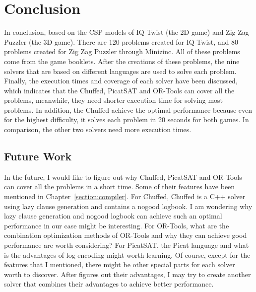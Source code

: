 \chapter{Conclusion}
\label{cha:conc}
In conclusion, based on the CSP models of IQ Twist (the 2D game) and Zig Zag Puzzler (the 3D game). There are 120 problems created for IQ Twist, and 80 problems created for Zig Zag Puzzler through Minizinc. All of these problems come from the game booklets. After the creations of these problems, the nine solvers that are based on different languages are used to solve each problem. Finally, the execution times and coverage of each solver have been discussed, which indicates that the Chuffed, PicatSAT and OR-Tools can cover all the problems, meanwhile, they need shorter execution time for solving most problems. In addition, the Chuffed achieve the optimal performance because even for the highest difficulty, it solves each problem in 20 seconds for both games. In comparison, the other two solvers need more execution times.
\section{Future Work}
\label{sec:future}
In the future, I would like to figure out why Chuffed, PicatSAT and OR-Tools can cover all the problems in a short time. Some of their features have been mentioned in Chapter~\ref{section:compiler}. 
For Chuffed,  Chuffed is a C++ solver using lazy clause generation and contains a nogood logbook. I am wondering why lazy clause generation and nogood logbook can achieve such an optimal performance in our case might be interesting. 
For OR-Tools, what are the combination optimization methods of OR-Tools and why they can achieve good performance are worth considering?
For PicatSAT, the Picat language and what is the advantages of log encoding might worth learning.
Of course, except for the features that I mentioned, there might be other special parts for each solver worth to discover. After figures out their advantages, I may try to create another solver that combines their advantages to achieve better performance.



